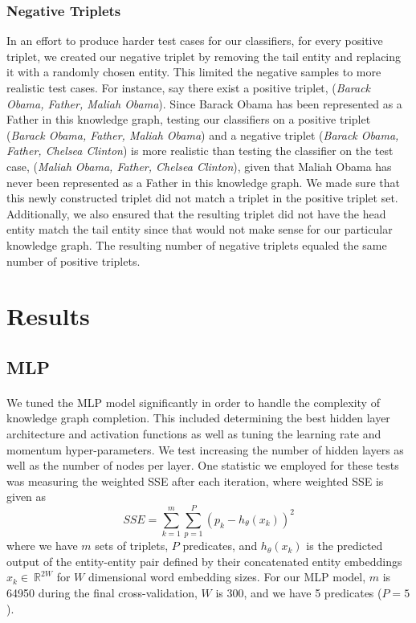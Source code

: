 \documentclass[11.5pt]{article}
\newcommand{\R}{\ \mathbb{R}}
\begin{document}
\subsubsection{Negative Triplets} In an effort to produce harder test cases for our classifiers, for every positive triplet, we created our negative triplet by removing the tail  entity and replacing it with a randomly chosen entity. This limited the negative samples to more realistic test cases. For instance, say there exist a positive triplet, (\textit{Barack Obama, Father, Maliah Obama}). Since Barack Obama has been represented as a Father in this knowledge graph, testing our classifiers on a positive triplet (\textit{Barack Obama, Father, Maliah Obama}) and a negative triplet (\textit{Barack Obama, Father, Chelsea Clinton}) is more realistic than testing the classifier on the test case, (\textit{Maliah Obama, Father, Chelsea Clinton}), given that Maliah Obama has never been represented as a Father in this knowledge graph.  We made sure that this newly constructed triplet did not match a triplet in the positive triplet set. Additionally, we also ensured that the resulting triplet did not have the head entity match the tail entity since that would not make sense for our particular knowledge graph. The resulting number of negative triplets equaled the same number of positive triplets.



\section{Results}
\subsection{MLP}

\paragraph{} We tuned the MLP model significantly in order to handle the complexity of knowledge graph completion. This included determining the best hidden layer architecture and activation functions as well as tuning the learning rate and momentum hyper-parameters.  We test increasing the number of hidden layers as well as the number of nodes per layer.  One statistic we employed for these tests was measuring the weighted SSE after each iteration, where weighted SSE is given as 
$$ SSE = \sum_{k=1}^m \sum_{p=1}^P (p_k - h_\theta(x_k))^2 $$
where we have $m$ sets of triplets, $P$ predicates, and $h_\theta(x_k)$ is the predicted output of the entity-entity pair defined by their concatenated entity embeddings $x_k\in \R^{2 W}$ for $W$ dimensional word embedding sizes. For our MLP model, $m$ is 64950 during the final cross-validation, $W$ is 300, and we have 5 predicates ($P=5$). 
\end{document}
